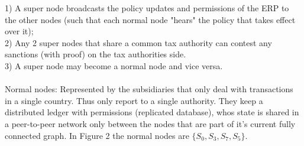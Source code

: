 1) A super node broadcasts the policy updates and permissions of the ERP to the other nodes (such that each normal node "hears" the policy that takes effect over it);\\
2) Any 2 super nodes that share a common tax authority can contest any sanctions (with proof) on the tax authorities side.\\
3) A super node may become a normal node and vice versa.\\
\\
Normal nodes: Represented by the subsidiaries that only deal with transactions in a single country. Thus only report to a single authority. They keep a distributed ledger with permissions (replicated database), whos state is shared in a peer-to-peer network only between the nodes that are part of it's current fully connected graph. In Figure 2 the normal nodes are $\{S_0,S_3,S_7,S_5\}$.\\
